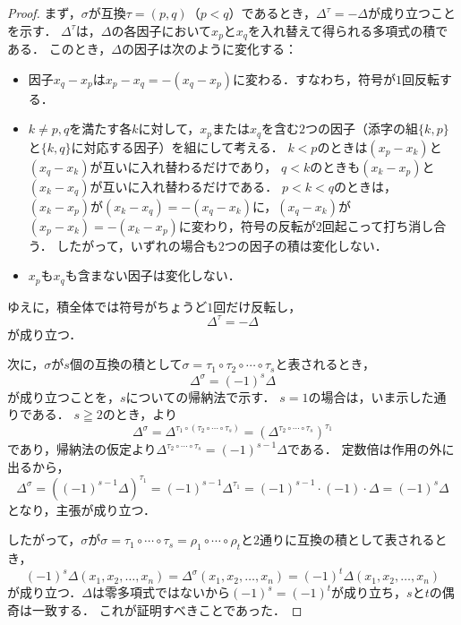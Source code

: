 \begin{tleftbar}
\begin{proof}
  まず，$\sigma$が互換$\tau = (p, q)$（$p < q$）であるとき，$\Delta^{\tau} = -\Delta$が成り立つことを示す．
  $\Delta^{\tau}$は，$\Delta$の各因子において$x_p$と$x_q$を入れ替えて得られる多項式の積である．
  このとき，$\Delta$の因子は次のように変化する：
  \begin{itemize}
    \item 因子$x_q - x_p$は$x_p - x_q = -(x_q - x_p)$に変わる．すなわち，符号が$1$回反転する．
    \item $k \ne p, q$を満たす各$k$に対して，$x_p$または$x_q$を含む$2$つの因子（添字の組$\{k, p\}$と$\{k, q\}$に対応する因子）を組にして考える．
      $k < p$のときは$(x_p - x_k)$と$(x_q - x_k)$が互いに入れ替わるだけであり，
      $q < k$のときも$(x_k - x_p)$と$(x_k - x_q)$が互いに入れ替わるだけである．
      $p < k < q$のときは，$(x_k - x_p)$が$(x_k - x_q) = -(x_q - x_k)$に，$(x_q - x_k)$が$(x_p - x_k) = -(x_k - x_p)$に変わり，符号の反転が$2$回起こって打ち消し合う．
      したがって，いずれの場合も$2$つの因子の積は変化しない．
    \item $x_p$も$x_q$も含まない因子は変化しない．
  \end{itemize}
  ゆえに，積全体では符号がちょうど$1$回だけ反転し，
  \[
    \Delta^{\tau} = -\Delta
  \]
  が成り立つ．

  次に，$\sigma$が$s$個の互換の積として$\sigma = \tau_1 \circ \tau_2 \circ \cdots \circ \tau_s$と表されるとき，
  \[
    \Delta^{\sigma} = (-1)^s \Delta
  \]
  が成り立つことを，$s$についての帰納法で示す．
  $s = 1$の場合は，いま示した通りである．
  $s \geqq 2$のとき，より
  \[
    \Delta^{\sigma}
    = \Delta^{\tau_1 \circ (\tau_2 \circ \cdots \circ \tau_s)}
    = \left( \Delta^{\tau_2 \circ \cdots \circ \tau_s} \right)^{\tau_1}
  \]
  であり，帰納法の仮定より$\Delta^{\tau_2 \circ \cdots \circ \tau_s} = (-1)^{s-1}\Delta$である．
  定数倍は作用の外に出るから，
  \[
    \Delta^{\sigma}
    = \left( (-1)^{s-1}\Delta \right)^{\tau_1}
    = (-1)^{s-1}\Delta^{\tau_1}
    = (-1)^{s-1} \cdot (-1) \cdot \Delta
    = (-1)^s \Delta
  \]
  となり，主張が成り立つ．

  したがって，$\sigma$が$\sigma = \tau_1 \circ \cdots \circ \tau_s = \rho_1 \circ \cdots \circ \rho_t$と$2$通りに互換の積として表されるとき，
  \[
  (-1)^s \Delta (x_1, x_2, \dots, x_n)
  = \Delta^{\sigma} (x_1, x_2, \dots, x_n)
  = (-1)^t \Delta (x_1, x_2, \dots, x_n)
  \]
  が成り立つ．$\Delta$は零多項式ではないから$(-1)^s = (-1)^t$が成り立ち，$s$と$t$の偶奇は一致する．
  これが証明すべきことであった．
\end{proof}
\end{tleftbar}


